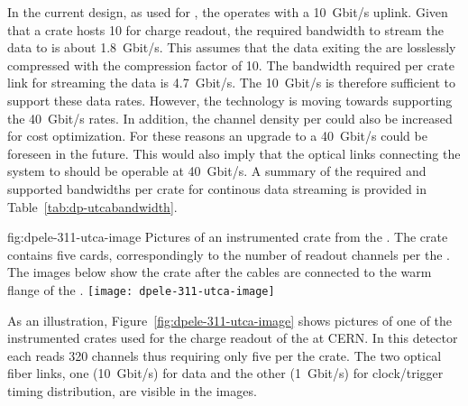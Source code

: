In the current design, as used for , the  operates with a \SI{10}{Gbit/s} uplink. Given that a  crate hosts \num{10}  for charge readout, the required bandwidth to stream the data to  is about \SI{1.8}{Gbit/s}. This assumes that the data exiting the  are losslessly compressed with the compression factor of \num{10}. The bandwidth required per crate link for streaming the  data is \SI{4.7}{Gbit/s}. The \SI{10}{Gbit/s}  is therefore sufficient to support these data rates. However, the technology is moving towards supporting the \SI{40}{Gbit/s} rates. In addition, the channel density per  could also be increased for cost optimization. For these reasons an upgrade to a \SI{40}{Gbit/s}  could be foreseen in the future. This would also imply that the optical links connecting the  system to   should be operable at \SI{40}{Gbit/s}. A summary of the required and supported bandwidths per  crate for continous data streaming is provided in Table~\ref{tab:dp-utcabandwidth}.

\begin{dunefigure}{fig:dpele-311-utca-image}
{Pictures of an instrumented  crate from the . The crate contains five  cards, correspondingly to the number of readout channels per the . The images below show the crate after the  cables are connected to the warm flange of the .}
\texttt{[image: dpele-311-utca-image]}
\end{dunefigure}

As an illustration, Figure~\ref{fig:dpele-311-utca-image} shows pictures of one of the instrumented  crates used for the charge readout of the  at CERN. In this detector each  reads \num{320} channels thus requiring only five  per the  crate. The two optical fiber links, one (\SI{10}{Gbit/s}) for data and the other (\SI{1}{Gbit/s}) for clock/trigger timing distribution, are visible in the images.       

